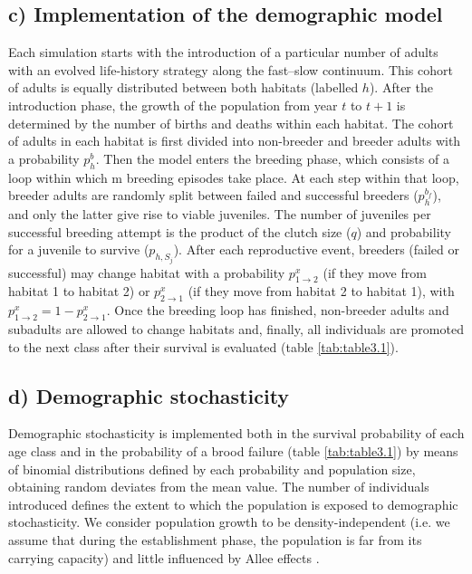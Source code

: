 \subsection*{c) Implementation of the demographic model}

Each simulation starts with the introduction of a particular
number of adults with an evolved life-history strategy along
the fast–slow continuum. This cohort of adults is equally
distributed between both habitats (labelled $h$). After the
introduction phase, the growth of the population from year $t$
to $t + 1$ is determined by the number of births and deaths
within each habitat. The cohort of adults in each habitat is
first divided into non-breeder and breeder adults with a probability
$p^{b}_{h}$. Then the model enters the breeding phase, which
consists of a loop within which m breeding episodes take
place. At each step within that loop, breeder adults are randomly
split between failed and successful breeders ($p^{b_{f}}_{h}$), and
only the latter give rise to viable juveniles. The number of juveniles
per successful breeding attempt is the product of the clutch
size ($q$) and probability for a juvenile to survive ($p_{h,S_{j}}$). After each
reproductive event, breeders (failed or successful) may change
habitat with a probability $p^{x}_{1\rightarrow2}$ (if they move from habitat 1 to
habitat 2) or $p^{x}_{2\rightarrow1}$ (if they move from habitat 2 to habitat 1),
with $p^{x}_{1 \rightarrow 2} = 1 - p^{x}_{2 \rightarrow 1}$. Once the breeding loop has finished,
non-breeder adults and subadults are allowed to change habitats
and, finally, all individuals are promoted to the next class
after their survival is evaluated (table \ref{tab:table3.1}).


\subsection*{d) Demographic stochasticity}

Demographic stochasticity is implemented both in the survival
probability of each age class and in the probability of a brood
failure (table \ref{tab:table3.1}) by means of binomial distributions defined
by each probability and population size, obtaining random
deviates from the mean value. The number of individuals
introduced defines the extent to which the population is
exposed to demographic stochasticity. We consider population
growth to be density-independent (i.e. we assume that during
the establishment phase, the population is far from its carrying
capacity) and little influenced by Allee effects \citep{kawecki1995demography}.


